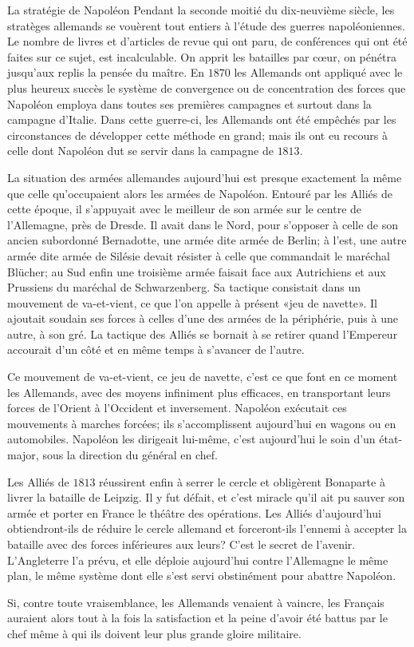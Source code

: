 \begin{chapter}{La stratégie de Napoléon}
Pendant la seconde moitié du dix-neuvième siècle, les stratèges
allemands se vouèrent tout entiers à l'étude des guerres
napoléoniennes. Le nombre de livres et d'articles de revue qui ont paru,
de conférences qui ont été faites sur ce sujet, est incalculable. On
apprit les batailles par cœur, on pénétra jusqu'aux replis la pensée
du maître. En $1870$ les Allemands ont appliqué avec le plus heureux
succès le système de convergence ou de concentration des forces que
Napoléon employa dans toutes ses premières campagnes et surtout dans la
campagne d'Italie. Dans cette guerre-ci, les Allemands ont été empêchés
par les circonstances de développer cette méthode en grand; mais ils ont
eu recours à celle dont Napoléon dut se servir dans la campagne de $1813$.

La situation des armées allemandes aujourd'hui est presque exactement la
même que celle qu'occupaient alors les armées de Napoléon. Entouré par
les Alliés de cette époque, il s'appuyait avec le meilleur de son armée
sur le centre de l'Allemagne, près de Dresde. Il avait dans le Nord,
pour s'opposer à celle de son ancien subordonné Bernadotte, une armée
dite armée de Berlin; à l'est, une autre armée dite armée de Silésie
devait résister à celle que commandait le maréchal Blücher; au Sud enfin
une troisième armée faisait face aux Autrichiens et aux Prussiens du
maréchal de Schwarzenberg. Sa tactique consistait dans un mouvement de
va-et-vient, ce que l'on appelle à présent «jeu de navette». Il ajoutait
soudain ses forces à celles d'une des armées de la périphérie, puis à
une autre, à son gré. La tactique des Alliés se bornait à se retirer
quand l'Empereur accourait d'un côté et en même temps à s'avancer de
l'autre.

Ce mouvement de va-et-vient, ce jeu de navette, c'est ce que font en ce
moment les Allemands, avec des moyens infiniment plus efficaces, en
transportant leurs forces de l'Orient à l'Occident et inversement.
Napoléon exécutait ces mouvements à marches forcées; ils s'accomplissent
aujourd'hui en wagons ou en automobiles. Napoléon les dirigeait
lui-même, c'est aujourd'hui le soin d'un état-major, sous la direction
du général en chef.

Les Alliés de $1813$ réussirent enfin à serrer le cercle et obligèrent
Bonaparte à livrer la bataille de Leipzig. Il y fut défait, et c'est
miracle qu'il ait pu sauver son armée et porter en France le théâtre des
opérations. Les Alliés d'aujourd'hui obtiendront-ils de réduire le
cercle allemand et forceront-ils l'ennemi à accepter la bataille avec
des forces inférieures aux leurs? C'est le secret de l'avenir.
L'Angleterre l'a prévu, et elle déploie aujourd'hui contre l'Allemagne
le même plan, le même système dont elle s'est servi obstinément pour
abattre Napoléon.

Si, contre toute vraisemblance, les Allemands venaient à vaincre, les
Français auraient alors tout à la fois la satisfaction et la peine
d'avoir été battus par le chef même à qui ils doivent leur plus grande
gloire militaire.

\end{chapter}


